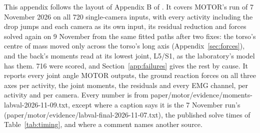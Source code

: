 \documentclass[11pt]{article}
\begin{document}
This appendix follows the layout of Appendix B of \cite{kardolus2026direct}. It covers MOTOR's run of 7 November 2026
on all 720 single-camera inputs, with every activity including the drop jumps and each camera as its own input, its
residual reduction and forces solved again on 9 November from the same fitted paths after two fixes: the torso's
centre of mass moved only across the torso's long axis (Appendix~\ref{sec:forces}), and the back's moments read at
its lowest joint, L5/S1, as the laboratory's model has them. 716 were scored, and Section~\ref{app:failures} gives the
rest by cause. It reports every joint angle MOTOR outputs, the ground reaction forces on all three axes per activity,
the joint moments, the residuals and every EMG channel, per activity and per camera. Every number is from
paper/motor/evidence/moments-labval-2026-11-09.txt, except where a caption says it is the 7 November run's
(paper/motor/evidence/labval-final-2026-11-07.txt), the published solve times of Table~\ref{tab:timing}, and where
a comment names another source.

\FloatBarrier
\end{document}
